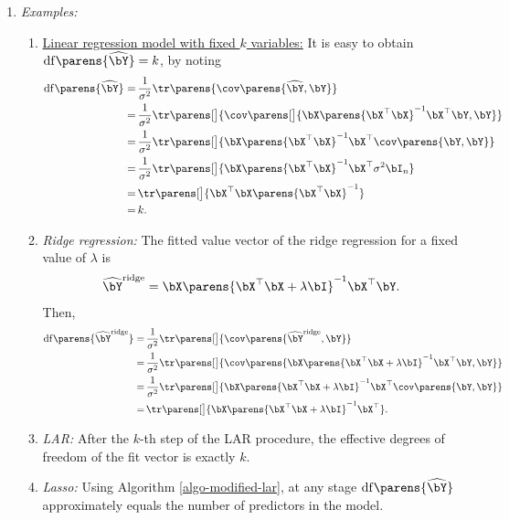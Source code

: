 \documentclass[12pt]{article}
\begin{document}
\begin{enumerate}[label=\textbf{\arabic*.}]
\begin{enumerate}
		\item \textit{Examples:}
		\begin{enumerate}
			\item \underline{Linear regression model with fixed $k$ variables:} It is easy to obtain $\mathrm{df} \parens{\widehat{\bY}} = k$, by noting 
			\begin{align*}
				\mathrm{df} \parens{\widehat{\bY}} = & \, \frac{1}{\sigma^2} \tr \parens{\cov \parens{\widehat{\bY}, \bY}} \\ 
				= & \, \frac{1}{\sigma^2} \tr \parens[\big]{\cov \parens[\big]{\bX \parens{\bX^\top \bX}^{-1} \bX^\top \bY, \bY}} \\ 
				= & \, \frac{1}{\sigma^2} \tr \parens[\big]{ \bX \parens{\bX^\top \bX}^{-1} \bX^\top \cov \parens{\bY, \bY}} \\ 
				= & \, \frac{1}{\sigma^2} \tr \parens[\big]{ \bX \parens{\bX^\top \bX}^{-1} \bX^\top \sigma^2 \bI_n} \\ 
				= & \, \tr \parens[\big]{ \bX^\top \bX \parens{\bX^\top \bX}^{-1} } \\ 
				= & \, k. 
			\end{align*}
			
			\item \textit{Ridge regression:} The fitted value vector of the ridge regression for a fixed value of $\lambda$ is 
			\begin{align*}
				\widehat{\bY}^{\mathrm{ridge}} = \bX \parens{\bX^\top \bX + \lambda \bI}^{-1} \bX^\top \bY. 
			\end{align*}
			Then, 
			\begin{align*}
				\mathrm{df} \parens{\widehat{\bY}^{\mathrm{ridge}}} = & \, \frac{1}{\sigma^2} \tr \parens[\big]{\cov \parens{\widehat{\bY}^{\mathrm{ridge}}, \bY}} \\ 
				= & \, \frac{1}{\sigma^2} \tr \parens[\big]{\cov \parens{\bX \parens{\bX^\top \bX + \lambda \bI}^{-1} \bX^\top \bY, \bY}} \\ 
				= & \, \frac{1}{\sigma^2} \tr \parens[\big]{\bX \parens{\bX^\top \bX + \lambda \bI}^{-1} \bX^\top \cov \parens{\bY, \bY}} \\ 
				= & \, \tr \parens[\big]{\bX \parens{\bX^\top \bX + \lambda \bI}^{-1} \bX^\top}. 
			\end{align*}
			
			\item \textit{LAR:} After the $k$-th step of the LAR procedure, the effective degrees of freedom of the fit vector is exactly $k$. 
			
			\item \textit{Lasso:} Using Algorithm \ref{algo-modified-lar}, at any stage $\mathrm{df} \parens{\widehat{\bY}}$ approximately equals the number of predictors in the model. 
			
		\end{enumerate}
	\end{enumerate}

\end{enumerate}
\end{document}
